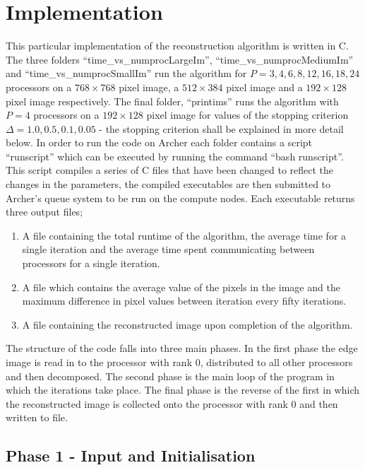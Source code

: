 \documentclass[12pt]{article}
\begin{document}
\section{Implementation}

This particular implementation of the reconstruction algorithm is written in C. The three folders ``time\_vs\_numprocLargeIm'', ``time\_vs\_numprocMediumIm'' and ``time\_vs\_numprocSmallIm'' run the algorithm for $P= 3,4,6,8,12,16,18,24$ processors on a $768\times768$ pixel image, a $512\times384$ pixel image and a $192\times128$ pixel image respectively. The final folder, ``printims'' runs the algorithm with $P = 4$ processors on a $192\times128$ pixel image for values of the stopping criterion $\Delta = 1.0,0.5,0.1,0.05$ - the stopping criterion shall be explained in more detail below. In order to run the code on Archer each folder contains a script ``runscript'' which can be executed by running the command ``bash runscript''. This script compiles a series of C files that have been changed to reflect the changes in the parameters, the compiled executables are then submitted to Archer's queue system to be run on the compute nodes. Each executable returns three output files;
\begin{enumerate} 
\item A file containing the total runtime of the algorithm, the average time for a single iteration and the average time spent communicating between processors for a single iteration.
\item A file which contains the average value of the pixels in the image and the maximum difference in pixel values between iteration every fifty iterations.
\item A file containing the reconstructed image upon completion of the algorithm.
\end{enumerate}

The structure of the code falls into three main phases. In the first phase the edge image is read in to the processor with rank 0, distributed to all other processors and then decomposed. The second phase is the main loop of the program in which the iterations take place. The final phase is the reverse of the first in which the reconstructed image is collected onto the processor with rank 0 and then written to file.

\subsection{Phase 1 - Input and Initialisation}
\end{document}
